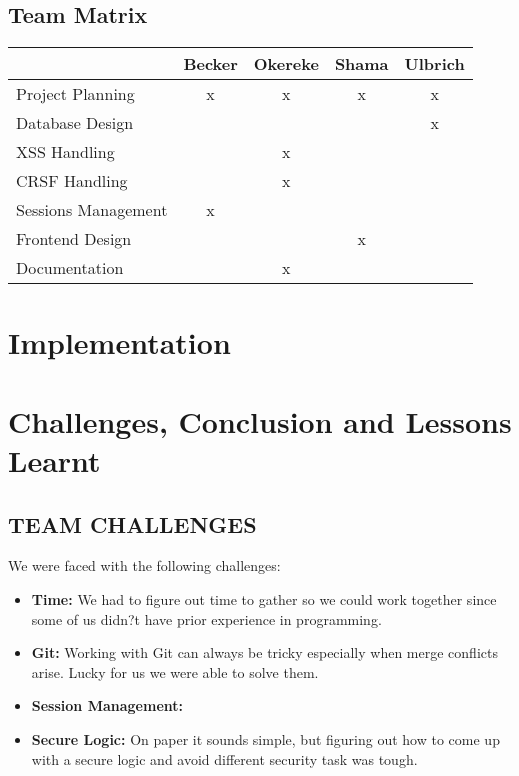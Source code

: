 \documentclass[12pt,a4paper]{article}
\begin{document}
\begin{flushleft}
	\section {Team Matrix}
	\begin{tabular}{|l|c|c|c|c|}
		\hline
		 & Becker & Okereke & Shama & Ulbrich \\ \hline
		 Project Planning & x & x & x & x \\ \hline
		 Database Design &  &  &  & x \\ \hline
		 XSS Handling &  & x &  &  \\ \hline
		 CRSF Handling &  & x &  &  \\ \hline
		 Sessions Management & x &  &  &  \\ \hline
		 Frontend Design &  &  & x &  \\ \hline
		 Documentation &  & x &  &  \\ \hline
		 
		
	\end{tabular}
	
	\end{flushleft}
		 	
		
	\section{Implementation}
	
	
	\section{Challenges, Conclusion and Lessons Learnt}
	\subsection{TEAM CHALLENGES}
	\begin{flushleft}
	
		We were faced with the following challenges:
		\begin{itemize}
			\item \textbf{Time:} We had to figure out time to gather so we could work together since some of us didn?t have prior
			experience in programming.
			\item \textbf{Git:} Working with Git can always be tricky especially when merge conflicts arise. Lucky for us we were able to solve them.
			\item \textbf{Session Management:}
			\item \textbf{Secure Logic:} On paper it sounds simple, but figuring out how to come up with a secure logic and avoid different security task was tough.
		\end{itemize}
		
	\end{flushleft}
	
\end{document}
